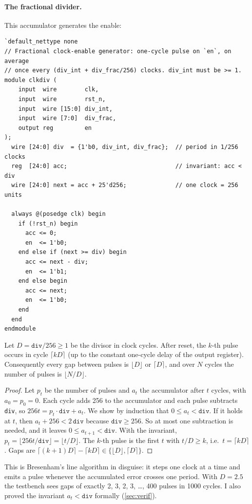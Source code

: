 \paragraph{The fractional divider.} This accumulator generates the enable:
{\small
\begin{verbatim}
`default_nettype none
// Fractional clock-enable generator: one-cycle pulse on `en`, on average
// once every (div_int + div_frac/256) clocks. div_int must be >= 1.
module clkdiv (
    input  wire        clk,
    input  wire        rst_n,
    input  wire [15:0] div_int,
    input  wire [7:0]  div_frac,
    output reg         en
);
  wire [24:0] div  = {1'b0, div_int, div_frac};  // period in 1/256 clocks
  reg  [24:0] acc;                               // invariant: acc < div
  wire [24:0] next = acc + 25'd256;              // one clock = 256 units

  always @(posedge clk) begin
    if (!rst_n) begin
      acc <= 0;
      en  <= 1'b0;
    end else if (next >= div) begin
      acc <= next - div;
      en  <= 1'b1;
    end else begin
      acc <= next;
      en  <= 1'b0;
    end
  end
endmodule
\end{verbatim}
}
\begin{proposition}\label{prop:clkdiv}
Let $D = \texttt{div}/256 \ge 1$ be the divisor in clock cycles. After reset,
the $k$-th pulse occurs in cycle $\lceil kD\rceil$ (up to the constant
one-cycle delay of the output register). Consequently every gap between
pulses is $\lfloor D\rfloor$ or $\lceil D\rceil$, and over $N$ cycles the
number of pulses is $\lfloor N/D\rfloor$.
\end{proposition}
\begin{proof}
Let $p_t$ be the number of pulses and $a_t$ the accumulator after $t$
cycles, with $a_0=p_0=0$. Each cycle adds 256 to the accumulator and each
pulse subtracts \texttt{div}, so $256t = p_t\cdot\texttt{div} + a_t$. We
show by induction that $0\le a_t<\texttt{div}$. If it holds at $t$, then
$a_t + 256 < 2\,\texttt{div}$ because $\texttt{div}\ge256$. So at most one
subtraction is needed, and it leaves $0 \le a_{t+1} < \texttt{div}$. With
the invariant, $p_t = \lfloor 256t/\texttt{div}\rfloor = \lfloor t/D\rfloor$.
The $k$-th pulse is the first $t$ with $t/D \ge k$, i.e.\
$t=\lceil kD\rceil$. Gaps are
$\lceil (k+1)D\rceil-\lceil kD\rceil\in\{\lfloor D\rfloor,\lceil D\rceil\}$.
\end{proof}
This is Bresenham's line algorithm in disguise: it steps one clock at a time
and emits a pulse whenever the accumulated error crosses one period. With
$D=2.5$ the testbench sees gaps of exactly 2, 3, 2, 3, \ldots, 400 pulses
in 1000 cycles. I also proved the invariant $a_t<\texttt{div}$ formally
(\cref{sec:verif}).

